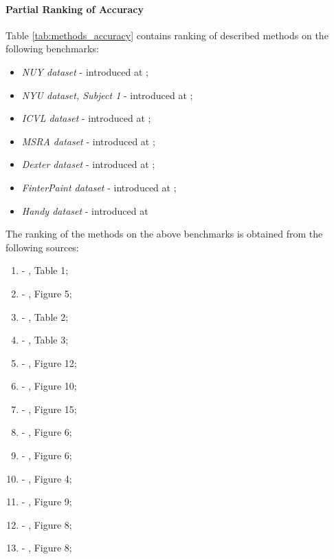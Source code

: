 
\paragraph{Partial Ranking of Accuracy} 
Table \ref{tab:methods_accuracy} contains ranking of described methods on the following benchmarks:

\vspace{-1em}
\begin{itemize}
\item \textit{NUY dataset} - introduced at \cite{tompson2014real};
\item \textit{NYU dataset, Subject 1} - introduced at \cite{tompson2014real};
\item \textit{ICVL dataset} - introduced at \cite{tang_cvpr14};
\item \textit{MSRA dataset} - introduced at \cite{sun2015cascaded};
\item \textit{Dexter dataset} - introduced at \cite{sridhar2013multicam};
\item \textit{FinterPaint dataset} - introduced at \cite{sharp2015accurate};
\item \textit{Handy dataset} - introduced at \cite{tkach2016sphere}
\end{itemize}

The ranking of the methods on the above benchmarks is obtained from the following sources:
\vspace{-1em}
\begin{enumerate} [label=\textbf{\Alph*}]
\item \label{nyu:oberweger2017-tab1} - \cite{oberweger2017deepprior++}, Table 1;
\item \label{nyu1:oberweger2017-fig5} -  \cite{oberweger2017deepprior++}, Figure 5;
\item \label{icvl:oberweger2017-tab2} - \cite{oberweger2017deepprior++}, Table 2;
\item \label{msra:oberweger2017-tab3} - \cite{oberweger2017deepprior++}, Table 3;
\item \label{dexter:taylor2017-fig12} - \cite{taylor2017articulated}, Figure 12;
\item \label{fingerpaint:taylor2016-fig10} - \cite{taylor2016concerto}, Figure 10;
\item \label{handy:taylor2017-fig15} - \cite{taylor2017articulated}, Figure 15;
\item \label{icvl:oberweger2017-fig6} - \cite{oberweger2017deepprior++}, Figure 6;
\item \label{icvl:tang2015-fig6} - \cite{tang2015opening}, Figure 6;
\item \label{dexter:sridhar2015-fig4} - \cite{sridhar2015fast}, Figure 4;
\item \label{handy:tkach2017-fig9} - \cite{tkach2017online}, Figure 9;
\item \label{nyu:dibra2017-fig8} - \cite{dibra2017refine}, Figure 8;
\item \label{nyu:neverova2017-fig8} - \cite{neverova2017hand}, Figure 8;
\end{enumerate}

